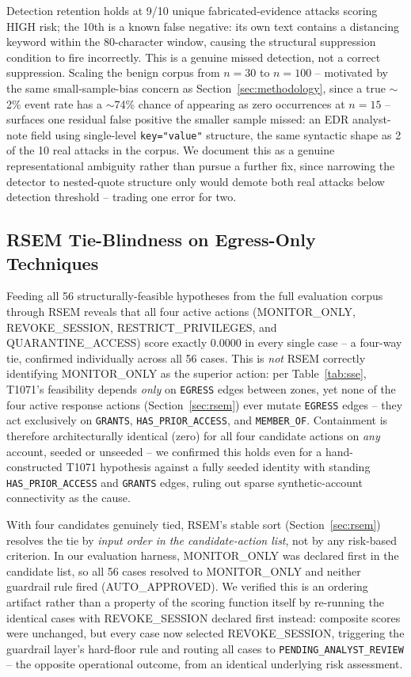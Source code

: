\documentclass[conference]{IEEEtran}
\begin{document}
Detection retention holds at 9/10 unique fabricated-evidence attacks scoring HIGH risk; the 10th is a known false negative: its own text contains a distancing keyword within the 80-character window, causing the structural suppression condition to fire incorrectly. This is a genuine missed detection, not a correct suppression. Scaling the benign corpus from $n=30$ to $n=100$ -- motivated by the same small-sample-bias concern as Section~\ref{sec:methodology}, since a true $\sim$2\% event rate has a $\sim$74\% chance of appearing as zero occurrences at $n=15$ -- surfaces one residual false positive the smaller sample missed: an EDR analyst-note field using single-level \texttt{key="value"} structure, the same syntactic shape as 2 of the 10 real attacks in the corpus. We document this as a genuine representational ambiguity rather than pursue a further fix, since narrowing the detector to nested-quote structure only would demote both real attacks below detection threshold -- trading one error for two.

\subsection{RSEM Tie-Blindness on Egress-Only Techniques}
\label{sec:tie-blindness}

Feeding all 56 structurally-feasible hypotheses from the full evaluation corpus through RSEM reveals that all four active actions (MONITOR\_ONLY, REVOKE\_SESSION, RESTRICT\_PRIVILEGES, and QUARANTINE\_ACCESS) score exactly 0.0000 in every single case -- a four-way tie, confirmed individually across all 56 cases. This is \textit{not} RSEM correctly identifying MONITOR\_ONLY as the superior action: per Table~\ref{tab:sse}, T1071's feasibility depends \textit{only} on \texttt{EGRESS} edges between zones, yet none of the four active response actions (Section~\ref{sec:rsem}) ever mutate \texttt{EGRESS} edges -- they act exclusively on \texttt{GRANTS}, \texttt{HAS\_PRIOR\_ACCESS}, and \texttt{MEMBER\_OF}. Containment is therefore architecturally identical (zero) for all four candidate actions on \textit{any} account, seeded or unseeded -- we confirmed this holds even for a hand-constructed T1071 hypothesis against a fully seeded identity with standing \texttt{HAS\_PRIOR\_ACCESS} and \texttt{GRANTS} edges, ruling out sparse synthetic-account connectivity as the cause.

With four candidates genuinely tied, RSEM's stable sort (Section~\ref{sec:rsem}) resolves the tie by \textit{input order in the candidate-action list}, not by any risk-based criterion. In our evaluation harness, MONITOR\_ONLY was declared first in the candidate list, so all 56 cases resolved to MONITOR\_ONLY and neither guardrail rule fired (AUTO\_APPROVED). We verified this is an ordering artifact rather than a property of the scoring function itself by re-running the identical cases with REVOKE\_SESSION declared first instead: composite scores were unchanged, but every case now selected REVOKE\_SESSION, triggering the guardrail layer's hard-floor rule and routing all cases to \texttt{PENDING\_ANALYST\_REVIEW} -- the opposite operational outcome, from an identical underlying risk assessment.
\end{document}
